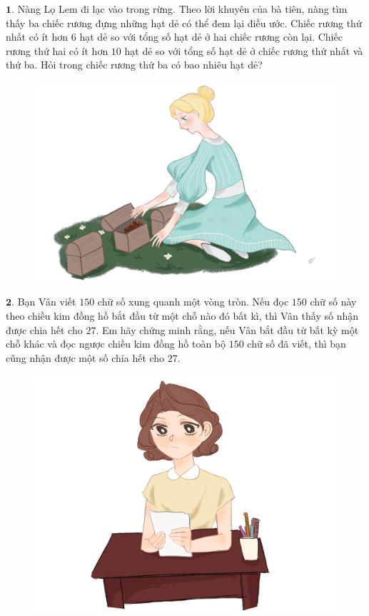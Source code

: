 \begin{multicols}{2}
	$\pmb{1.}$ Nàng Lọ Lem đi lạc vào trong rừng. Theo lời khuyên của bà tiên, nàng tìm thấy ba chiếc rương đựng những hạt dẻ có thể đem lại điều ước. Chiếc rương thứ nhất có ít hơn $6$ hạt dẻ so với  tổng số hạt dẻ ở hai chiếc rương còn lại. Chiếc rương thứ hai có ít hơn $10$ hạt dẻ so với tổng số hạt dẻ ở chiếc rương thứ nhất và thứ ba. Hỏi trong chiếc rương thứ ba có bao nhiêu hạt dẻ?
	\begin{figure}[H]
		\centering
		\vspace*{-5pt}
		\captionsetup{labelformat= empty, justification=centering}
		\includegraphics[width=0.85\linewidth]{Hinh1}
		\vspace*{-10pt}
	\end{figure}
	$\pmb{2.}$ Bạn Vân viết $150$ chữ số xung quanh một vòng tròn. Nếu đọc $150$ chữ số này theo chiều kim đồng hồ bắt đầu từ một chỗ nào đó bất kì, thì Vân thấy số nhận được chia hết cho $27$. Em hãy chứng minh rằng, nếu Vân bắt đầu từ bất kỳ một chỗ khác và đọc ngược chiều kim đồng hồ toàn bộ $150$ chữ số đã viết, thì bạn cũng nhận được một số chia hết cho $27$.
	\begin{figure}[H]
		\centering
		\vspace*{-5pt}
		\captionsetup{labelformat= empty, justification=centering}
		\includegraphics[width=0.85\linewidth]{Hinh2}

\end{figure}
\end{multicols}
